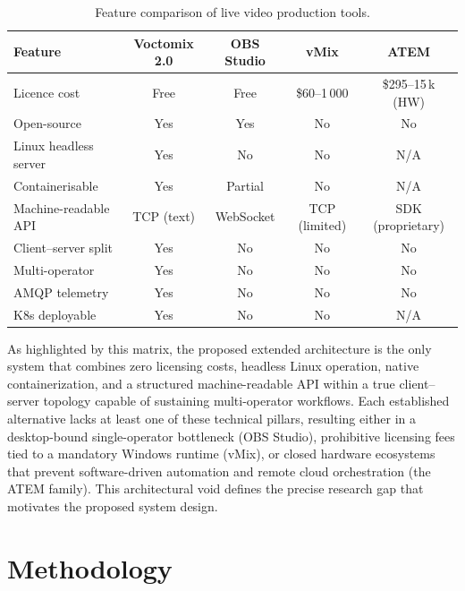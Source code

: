 \documentclass[electronics,article,submit,pdftex,moreauthors]{Definitions/mdpi}
\begin{document}
\begin{table}[H]
\caption{Feature comparison of live video production tools.\label{tab:comparison}}
\small
\begin{tabularx}{\textwidth}{XCCCC}
\toprule
\textbf{Feature} & \textbf{Voctomix 2.0} & \textbf{OBS Studio} & \textbf{vMix} & \textbf{ATEM}\\
\midrule
Licence cost           & Free       & Free       & \$60--1\,000  & \$295--15\,k (HW)\\
Open-source            & Yes        & Yes        & No            & No\\
Linux headless server  & Yes        & No         & No            & N/A\\
Containerisable        & Yes        & Partial    & No            & N/A\\
Machine-readable API   & TCP (text) & WebSocket  & TCP (limited) & SDK (proprietary)\\
Client--server split   & Yes        & No         & No            & No\\
Multi-operator         & Yes        & No         & No            & No\\
AMQP telemetry         & Yes        & No         & No            & No\\
K8s deployable         & Yes        & No         & No            & N/A\\
\bottomrule
\end{tabularx}
\end{table}

As highlighted by this matrix, the proposed extended architecture is the only system that combines zero licensing costs, headless Linux operation, native containerization, and a structured machine-readable API within a true client--server topology capable of sustaining multi-operator workflows. Each established alternative lacks at least one of these technical pillars, resulting either in a desktop-bound single-operator bottleneck (OBS Studio), prohibitive licensing fees tied to a mandatory Windows runtime (vMix), or closed hardware ecosystems that prevent software-driven automation and remote cloud orchestration (the ATEM family). This architectural void defines the precise research gap that motivates the proposed system design.

\section{Methodology}
\label{sec:architecture}
\end{document}

